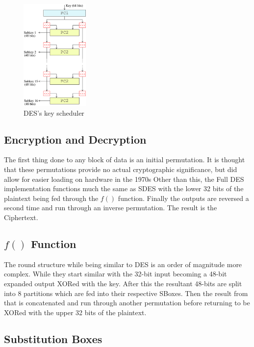 \begin{figure}[ht]
\begin{center}
\includegraphics[width=0.3\textwidth]{./DESkey}
\end{center}
\caption{DES's key scheduler}
\end{figure}

\subsection{Encryption and Decryption}

The first thing done to any block of data is an initial permutation.
It is thought that these permutations provide no actual cryptographic significance, but did allow for easier loading on hardware in the 1970s
Other than this, the Full DES implementation functions much the same as SDES with the lower 32 bits of the plaintext being fed through the $f()$ function.
Finally the outputs are reversed a second time and run through an inverse permutation.
The result is the Ciphertext.

\subsection{$f()$ Function}
The round structure while being similar to DES is an order of magnitude more complex.
While they start similar with the 32-bit input becoming a 48-bit expanded output XORed with the key. 
After this the resultant 48-bits are split into 8 partitions which are fed into their 
respective SBoxes.
Then the result from that is  concatenated and run through another permutation before returning to be XORed with the upper 32 bits of the plaintext.

\subsection{ Substitution Boxes }


